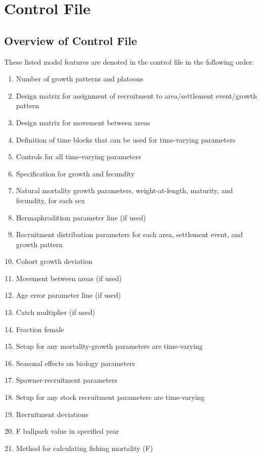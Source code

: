 \section{Control File}
\subsection{Overview of Control File}
These listed model features are denoted in the control file in the following order:
	\begin{enumerate}
		\item Number of growth patterns and platoons
		\item Design matrix for assignment of recruitment to area/settlement event/growth pattern
		\item Design matrix for movement between areas
		\item Definition of time blocks that can be used for time-varying parameters
		\item Controls far all time-varying parameters
		\\
		\item Specification for growth and fecundity
		\item Natural mortality growth parameters, weight-at-length, maturity, and fecundity, for each sex 
		\item Hermaphroditism parameter line (if used)
		\item Recruitment distribution parameters for each area, settlement event, and growth pattern
		\item Cohort growth deviation
		\item Movement between areas (if used)
		\item Age error parameter line (if used)
		\item Catch multiplier (if used)
		\item Fraction female 
		\item Setup for any mortality-growth parameters are time-varying
		\item Seasonal effects on biology parameters
		\\
		\item Spawner-recruitment parameters
		\item Setup for any stock recruitment parameters are time-varying
		\item Recruitment deviations
		\\
		\item F ballpark value in specified year
		\item Method for calculating fishing mortality (F)

\end{enumerate}
